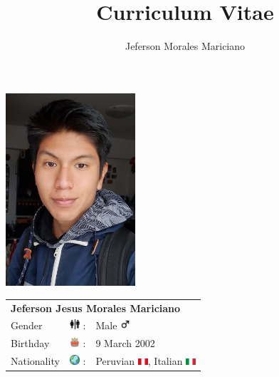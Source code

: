 \documentclass[letterpaper, 11pt]{article}
\title{Curriculum Vitae}
\author{Jeferson Morales Mariciano}
\date{}
\begin{document}
\thispagestyle{fancy}
\begin{minipage}[t]{\linewidth}
    \begin{minipage}[ht]{0.4\linewidth}
        \includegraphics[width=13em, left]{viso}
    \end{minipage}
    \begin{minipage}[ht]{0.5\linewidth}
        \begin{tabular}{lcl}
            \multicolumn{3}{l}{\large\textbf{Jeferson Jesus Morales Mariciano}\normalsize} \\
            Gender
            &
            \includegraphics[width=1em]{logo/gender} :
            &
            Male
            \includegraphics[width=1em]{logo/male}
            \\
            Birthday
            &
            \includegraphics[width=1em]{logo/cake} :
            &
            9 March 2002
            \\
            Nationality
            &
            \includegraphics[width=1em]{logo/globe} :
            &
            Peruvian
            \includegraphics[width=1em]{logo/peru},
            Italian
            \includegraphics[width=1em]{logo/italy}
            \\
        \end{tabular}


\end{minipage}
\end{minipage}
\end{document}
